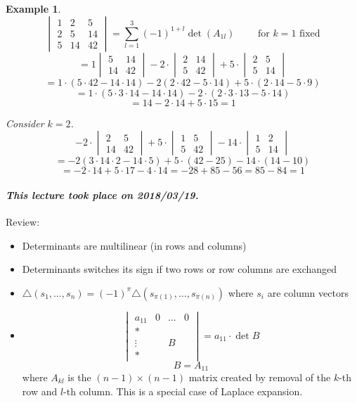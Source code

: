 \documentclass{article}
\newtheorem{example}{Example}  \numberwithin{example}{section}
\newcommand{\dateref}[1]{\paragraph{\textit{This lecture took place on #1.}}}
\begin{document}
\begin{example} %
  \[
    \begin{vmatrix}
      1 & 2 & 5 \\
      2 & 5 & 14 \\
      5 & 14 & 42
    \end{vmatrix}
    = \sum_{l=1}^3 (-1)^{1+l} \det(A_{1l})
    \qquad \text{ for $k=1$ fixed}
  \]
  \[ = 1 \begin{vmatrix} 5 & 14 \\ 14 & 42 \end{vmatrix} - 2 \cdot \begin{vmatrix} 2 & 14 \\ 5 & 42 \end{vmatrix} + 5 \cdot \begin{vmatrix} 2 & 5 \\ 5 & 14 \end{vmatrix} \]
  \[ = 1 \cdot (5 \cdot 42 - 14 \cdot 14) - 2 (2 \cdot 42 - 5 \cdot 14) + 5 \cdot (2 \cdot 14 - 5 \cdot 9) \]
  \[ = 1 \cdot (5 \cdot 3 \cdot 14 - 14 \cdot 14) - 2 \cdot (2 \cdot 3 \cdot 13 - 5 \cdot 14) \]
  \[ = 14 - 2 \cdot 14 + 5 \cdot 15 = 1 \]

  Consider $k=2$.
  \[
    -2 \cdot \begin{vmatrix} 2 & 5 \\ 14 & 42 \end{vmatrix} + 5 \cdot \begin{vmatrix} 1 & 5 \\ 5 & 42 \end{vmatrix} - 14 \cdot \begin{vmatrix} 1 & 2 \\ 5 & 14 \end{vmatrix}
  \] \[
    = -2 (3 \cdot 14 \cdot 2 - 14 \cdot 5) + 5 \cdot (42 - 25) - 14 \cdot (14 - 10)
  \] \[
    = -2 \cdot 14 + 5 \cdot 17 - 4 \cdot 14 = -28 +85 -56 = 85 - 84 = 1
  \]
\end{example}

\dateref{2018/03/19}

Review:
\begin{itemize}
  \item Determinants are multilinear (in rows and columns)
  \item Determinants switches its sign if two rows or row columns are exchanged
  \item $\triangle(s_1, \dots, s_n) = (-1)^\pi \triangle(s_{\pi(1)}, \dots, s_{\pi(n)})$ where $s_i$ are column vectors
  \item
    \[
      \begin{vmatrix}
        a_{11} & 0 & \dots & 0 \\
        * &        &       & \\
        \vdots &   &  B    & \\
        * &        &       &
      \end{vmatrix}
      = a_{11} \cdot \det{B}
    \] \[
      B = A_{11}
    \]
    where $A_{kl}$ is the $(n-1) \times (n-1)$ matrix created by removal of the $k$-th row and $l$-th column.
    This is a special case of Laplace expansion.
\end{itemize}
\end{document}
